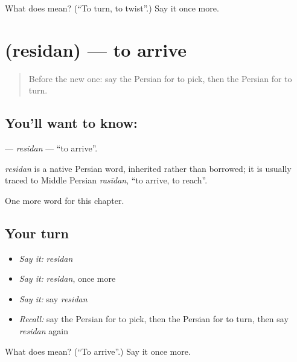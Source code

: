 \begin{tcolorbox}[breakable,colback=teal!4,colframe=teal!35!black,title={Before you move on}]
What does  mean? (\textquotedblleft{}To turn, to twist\textquotedblright{}.) Say it once more.
\end{tcolorbox}
\section[\texorpdfstring{\fa{رسیدن} (residan)}{رسیدن (residan)}]{ (residan) — to arrive}

\label{lesson:FA-C133-residan}



\begin{quote}
Before the new one: say the Persian for to pick, then the Persian for to turn.
\end{quote}

\subsection*{You'll want to know: }
\textbf{} — \emph{residan} — \textquotedblleft{}to arrive\textquotedblright{}.

\begin{cousinweb}
\emph{residan} is a native Persian word, inherited rather than borrowed; it is usually traced to Middle Persian \emph{rasīdan}, \textquotedblleft{}to arrive, to reach\textquotedblright{}.
\end{cousinweb}

\begin{grammarlens}[title={What you've built}]
One more word for this chapter.
\end{grammarlens}

\subsection*{Your turn}
\begin{itemize}
\raggedright
  \item \emph{Say it:} \emph{residan}
  \item \emph{Say it:} \emph{residan}, once more
  \item \emph{Say it:} say \emph{residan}
  \item \emph{Recall:} say the Persian for to pick, then the Persian for to turn, then say \emph{residan} again
\end{itemize}

\begin{tcolorbox}[breakable,colback=teal!4,colframe=teal!35!black,title={Before you move on}]
What does  mean? (\textquotedblleft{}To arrive\textquotedblright{}.) Say it once more.
\end{tcolorbox}
